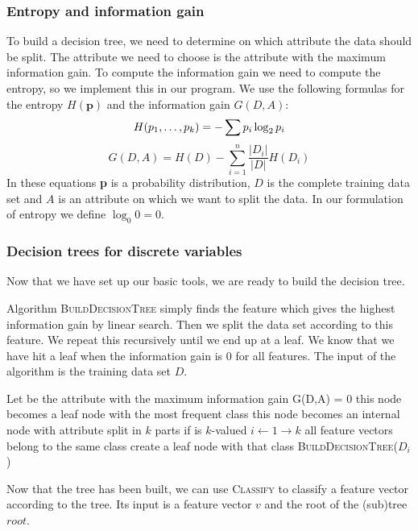\documentclass[10pt,a4paper]{article}
\begin{document}
\subsubsection{Entropy and information gain}
To build a decision tree, we need to determine on which attribute the data should be split. The attribute we need to choose is the attribute with the maximum information gain. To compute the information gain we need to compute the entropy, so we implement this in our program. We use the following formulas for the entropy $H(\textbf{p})$ and the information gain $G(D,A)$:
\begin{equation*}
H(p_1, \dots, p_k) = -\sum p_i\log_2p_i\\
\end{equation*}
\begin{equation*}
G(D,A) = H(D) - \sum_{i=1}^n \frac{|D_i|}{|D|} H(D_i)
\end{equation*}
In these equations \textbf{p} is a probability distribution, $D$ is the complete training data set and $A$ is an attribute on which we want to split the data. In our formulation of entropy we define $\log_0 0 = 0$.
\subsubsection{Decision trees for discrete variables}
Now that we have set up our basic tools, we are ready to build the decision tree. 

Algorithm \textsc{BuildDecisionTree} simply finds the feature which gives the highest information gain by linear search. Then we split the data set according to this feature. We repeat this recursively until we end up at a leaf. We know that we have hit a leaf when the information gain is 0 for all features. The input of the algorithm is the training data set $D$. 

\begin{codebox}
\li Let  be the attribute with the maximum information gain
\li \If G(D,A) = 0 \Then
\li this node becomes a leaf node with the most frequent class 
\li	\Else
	this node becomes an internal node with attribute 
\li split  in $k$ parts  if  is $k$-valued
\li \For $i \gets 1 \to k$ \Do
\li 	\If all feature vectors belong to the same class \Then
\li	create a leaf node with that class
\li	\Else
	\textsc{BuildDecisionTree($D_i$)}
	\End
	\End
\End
\end{codebox}

Now that the tree has been built, we can use \textsc{Classify} to classify a feature vector according to the tree. Its input is a feature vector $v$ and the root of the (sub)tree $root$.
\end{document}
